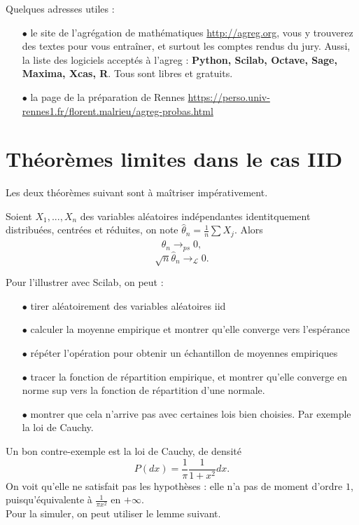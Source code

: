 Quelques adresses utiles :
\begin{itemize}
\item[$\bullet$]le site de l'agrégation de mathématiques \url{http://agreg.org}, vous y trouverez des textes pour vous entraîner, et surtout les comptes rendus du jury. Aussi, la liste des logiciels acceptés à l'agreg : \textbf{Python, Scilab, Octave, Sage, Maxima, Xcas, R}. Tous sont libres et gratuits.
\item[$\bullet$]la page de la préparation de Rennes  \url{https://perso.univ-rennes1.fr/florent.malrieu/agreg-probas.html}
\end{itemize}

\section{Théorèmes limites dans le cas IID}

Les deux théorèmes suivant sont à maîtriser impérativement.

\begin{thm}
Soient $X_1,...,X_n$ des variables aléatoires indépendantes identitquement distribuées, centrées et réduites, on note $\hat \theta_n =\frac{1}{n}\sum X_j$. Alors
\[\hat\theta_n\rightarrow _{ps}0,\]
\[\sqrt{n}\hat\theta_n\rightarrow _{\mathcal L}0.\] 
\end{thm}

Pour l'illustrer avec Scilab, on peut :\\

\begin{itemize}
\item[$\bullet$] tirer aléatoirement des variables aléatoires iid
\item[$\bullet$] calculer la moyenne empirique et montrer qu'elle converge vers l'espérance
\item[$\bullet$] répéter l'opération pour obtenir un échantillon de moyennes empiriques
\item[$\bullet$] tracer la fonction de répartition empirique, et montrer qu'elle converge en norme sup vers la fonction de répartition d'une normale. 
\item[$\bullet$] montrer que cela n'arrive pas avec certaines lois bien choisies. Par exemple la loi de Cauchy.\\
\end{itemize}

Un bon contre-exemple est la loi de Cauchy, de densité 
\[P(dx)=\frac{1}{\pi}\frac{1}{1+x^2}dx.\]
On voit qu'elle ne satisfait pas les hypothèses : elle n'a pas de moment d'ordre $1$, puisqu'équivalente à $\frac{1}{\pi x^2}$ en $+\infty$.\\ 
Pour la simuler, on peut utiliser le lemme suivant. 


